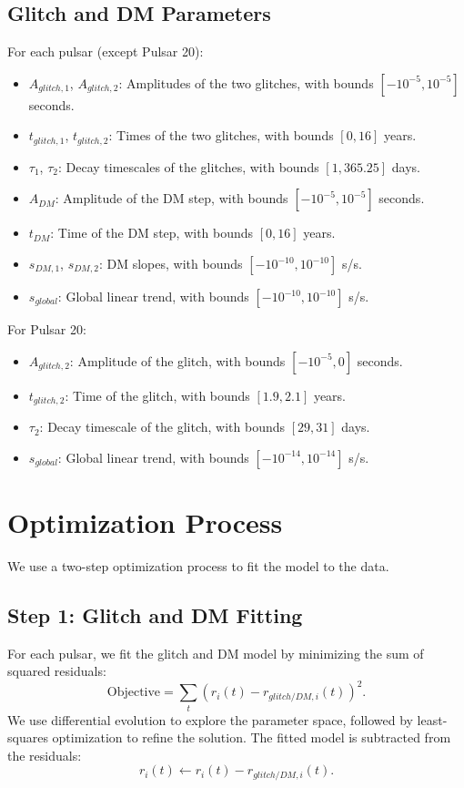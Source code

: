 \documentclass[11pt]{article}
\begin{document}
\subsection{Glitch and DM Parameters}
For each pulsar (except Pulsar 20):
\begin{itemize}
    \item $A_{glitch,1}$, $A_{glitch,2}$: Amplitudes of the two glitches, with bounds $[-10^{-5}, 10^{-5}]$ seconds.
    \item $t_{glitch,1}$, $t_{glitch,2}$: Times of the two glitches, with bounds $[0, 16]$ years.
    \item $\tau_{1}$, $\tau_{2}$: Decay timescales of the glitches, with bounds $[1, 365.25]$ days.
    \item $A_{DM}$: Amplitude of the DM step, with bounds $[-10^{-5}, 10^{-5}]$ seconds.
    \item $t_{DM}$: Time of the DM step, with bounds $[0, 16]$ years.
    \item $s_{DM,1}$, $s_{DM,2}$: DM slopes, with bounds $[-10^{-10}, 10^{-10}]$ s/s.
    \item $s_{global}$: Global linear trend, with bounds $[-10^{-10}, 10^{-10}]$ s/s.
\end{itemize}

For Pulsar 20:
\begin{itemize}
    \item $A_{glitch,2}$: Amplitude of the glitch, with bounds $[-10^{-5}, 0]$ seconds.
    \item $t_{glitch,2}$: Time of the glitch, with bounds $[1.9, 2.1]$ years.
    \item $\tau_{2}$: Decay timescale of the glitch, with bounds $[29, 31]$ days.
    \item $s_{global}$: Global linear trend, with bounds $[-10^{-14}, 10^{-14}]$ s/s.
\end{itemize}

\section{Optimization Process}
We use a two-step optimization process to fit the model to the data.

\subsection{Step 1: Glitch and DM Fitting}
For each pulsar, we fit the glitch and DM model by minimizing the sum of squared residuals:
\[
\text{Objective} = \sum_{t} \left( r_i(t) - r_{glitch/DM,i}(t) \right)^2.
\]
We use differential evolution to explore the parameter space, followed by least-squares optimization to refine the solution. The fitted model is subtracted from the residuals:
\[
r_i(t) \leftarrow r_i(t) - r_{glitch/DM,i}(t).
\]
\end{document}
